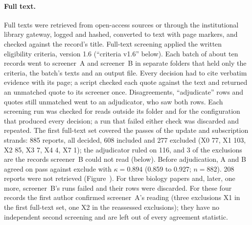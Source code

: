 \documentclass[acmsmall,screen]{acmart}
\makeatletter
\newcommand{\Mref}[1]{\@ifundefined{mr@#1}{\textbf{??}}{\csname mr@#1\endcsname}}
\makeatother
\begin{document}
\paragraph{Full text.}
Full texts were retrieved from open-access sources or through the institutional library gateway, logged and hashed, converted to text with page markers, and checked against the record's title. Full-text screening applied the written eligibility criteria, version 1.6 (``criteria v1.6'' below). %
Each batch of about ten records went to screener~A and screener~B in separate folders that held only the criteria, the batch's texts and an output file. Every decision had to cite verbatim evidence with its page; a script checked each quote against the text and returned an unmatched quote to its screener once. Disagreements, ``adjudicate'' rows and quotes still unmatched went to an adjudicator, who saw both rows. %
Each screening run was checked for reads outside its folder and for the configuration that produced every decision; a run that failed either check was discarded and repeated. %
The first full-text set covered the passes of the update and subscription strands: 885 reports, all decided, 608 included and 277 excluded (X0 77, X1 103, X2 85, X3 7, X4 4, X7 1); the adjudicator ruled on 116, and 3 of the exclusions are the records screener~B could not read (below). Before adjudication, A and B agreed on pass against exclude with $\kappa=0.894$ (0.859 to 0.927; $n=882$). %
208 reports were not retrieved (Figure~\Mref{fig:prisma}). %
For three biology papers and, later, one more, screener~B's runs failed and their rows were discarded. For these four records the first author confirmed screener~A's reading (three exclusions X1 in the first full-text set, one X2 in the reassessed exclusions); they have no independent second screening and are left out of every agreement statistic. %
\end{document}
